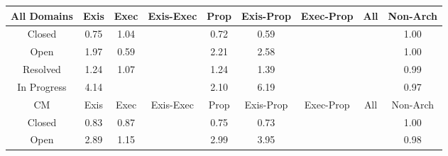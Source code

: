 \begin{tabular}{|c||c|c|c|c|c|c|c|c|}
\hline
All Domains & Exis & Exec & Exis-Exec & Prop & Exis-Prop & Exec-Prop & All & Non-Arch \\ 
\hline
Closed & \cellcolor[rgb]{0.8614140302648362,0.6100264099202248,0.3746530949138472} 0.75 & \cellcolor[rgb]{0.909815806427089,0.8399127504128315,0.42} 1.04 &  & \cellcolor[rgb]{0.8557239814814341,0.5830935123454548,0.36934238271600517} 0.72 & \cellcolor[rgb]{0.830068548504875,0.46165779625640807,0.34539731193788326} 0.59 &  &  & \cellcolor[rgb]{0.9099927232811754,0.8399965531331883,0.42} 1.00 \\ 
\hline
Open & \cellcolor[rgb]{0.9051565957803523,0.8377057558959564,0.42} 1.97 & \cellcolor[rgb]{0.8314485695339755,0.46818989579415016,0.34668533156504366} 0.59 &  & \cellcolor[rgb]{0.9039245434987426,0.8371221521836149,0.42} 2.21 & \cellcolor[rgb]{0.9020854492977984,0.8362510022989571,0.42} 2.58 &  &  & \cellcolor[rgb]{0.9099751829871886,0.8399882445728788,0.42} 1.00 \\ 
\hline
Resolved & \cellcolor[rgb]{0.908821079385551,0.8394415639194716,0.42} 1.24 & \cellcolor[rgb]{0.9096698298372273,0.8398436036071076,0.42} 1.07 &  & \cellcolor[rgb]{0.9087806689117406,0.8394224221160876,0.42} 1.24 & \cellcolor[rgb]{0.9080404272474628,0.8390717813277455,0.42} 1.39 &  &  & \cellcolor[rgb]{0.9089409914419417,0.8349873594918571,0.4190115920124789} 0.99 \\ 
\hline
In Progress & \cellcolor[rgb]{0.8942314555377945,0.8325306894652711,0.42} 4.14 &  &  & \cellcolor[rgb]{0.9044663467133465,0.837378795811585,0.42} 2.10 & \cellcolor[rgb]{0.8839396879502704,0.8276556416606544,0.42} 6.19 &  &  & \cellcolor[rgb]{0.9042831661147805,0.812940319609961,0.41466428837379515} 0.97 \\ 
\hline
\hline
CM & Exis & Exec & Exis-Exec & Prop & Exis-Prop & Exec-Prop & All & Non-Arch \\ 
\hline
Closed & \cellcolor[rgb]{0.877159399401254,0.6845544904992689,0.38934877277450375} 0.83 & \cellcolor[rgb]{0.8843347156904499,0.718517654268129,0.3960457346444198} 0.87 &  & \cellcolor[rgb]{0.8623130403300933,0.6142817242291079,0.3754921709747537} 0.75 & \cellcolor[rgb]{0.8586030681724585,0.5967211893496368,0.3720295302942946} 0.73 &  &  & \cellcolor[rgb]{0.9099805506544857,0.8399907871521247,0.42} 1.00 \\ 
\hline
Open & \cellcolor[rgb]{0.9005010846877485,0.8355005137994598,0.42} 2.89 & \cellcolor[rgb]{0.9092363388071236,0.8396382657507427,0.42} 1.15 &  & \cellcolor[rgb]{0.900015183625055,0.8352703501381838,0.42} 2.99 & \cellcolor[rgb]{0.8952186596817091,0.8329983124808095,0.42} 3.95 &  &  & \cellcolor[rgb]{0.9068457767353786,0.8250700098807918,0.41705605828635334} 0.98 \\ 

\end{tabular}
